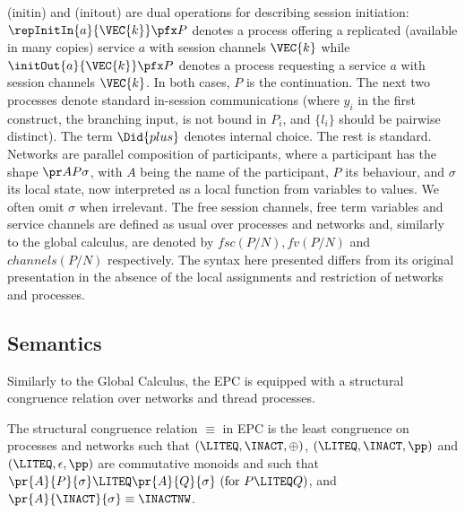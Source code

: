

(initin) and (initout) are dual operations for describing session
initiation: $\repInitIn{a}{\VEC{k}} \pfx P$ denotes a process
offering a replicated (available in many copies) service $a$ with
session channels $\VEC{k}$ while $\initOut{a}{\VEC{k}} \pfx P$ denotes a
process requesting a service $a$ with session channels $\VEC{k}$. In
both cases, $P$ is the continuation. The next two processes denote
standard in-session communications (where $y_i$ in the first
construct, the branching input, is not bound in $P_i$, and $\{l_i\}$
should be pairwise distinct). 
The term $\Did{plus}$
denotes internal choice. The rest is standard. Networks are parallel
composition of participants, where a participant has the shape $\pr
AP\sigma$, with $A$ being the name of the participant, $P$ its
behaviour, and $\sigma$ its local state, now interpreted as a local
function from variables to values. We often omit $\sigma$ when
irrelevant. The free session channels, free term variables and service
channels are defined as usual over processes and networks and,
similarly to the global calculus, are denoted by $fsc(P/N), fv(P/N)$ and
$channels(P/N)$ respectively. The syntax here presented differs from
its original presentation in the absence of the local assignments 
and restriction of networks and processes.

\subsection{Semantics}

Similarly to the Global Calculus, the EPC is equipped with a
structural congruence relation over networks and thread processes.
\begin{definition}
The structural congruence relation $\equiv$ in EPC is the least
congruence on processes and networks such that $(\LITEQ, \INACT,
\oplus)$, 
$(\LITEQ, \INACT, \pp)$ and $(\LITEQ,
\epsilon, \pp)$
are commutative monoids and such
that 
$ \pr{A}{P}{\sigma} \LITEQ
\pr{A}{Q}{\sigma} ~ (\text{for }P \LITEQ Q)$, and
$ \pr{A}{\INACT}{\sigma} \equiv \INACTNW$.
\end{definition}

